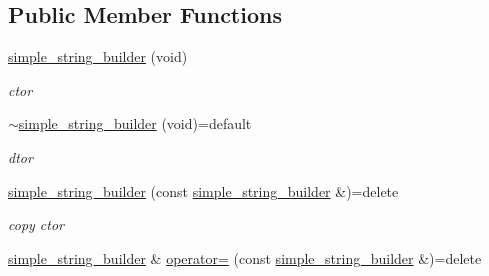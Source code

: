 \subsection*{Public Member Functions}
\begin{DoxyCompactItemize}
\item 
\mbox{\label{classcpp__redis_1_1builders_1_1simple__string__builder_a51fcb7777a78cbd3599aae8896e4d06a}} 
\hyperlink{classcpp__redis_1_1builders_1_1simple__string__builder_a51fcb7777a78cbd3599aae8896e4d06a}{simple\+\_\+string\+\_\+builder} (void)
\begin{DoxyCompactList}\small\item\em ctor \end{DoxyCompactList}\item 
\mbox{\label{classcpp__redis_1_1builders_1_1simple__string__builder_a7b4f012c532535801f9d5fddbb01d675}} 
\hyperlink{classcpp__redis_1_1builders_1_1simple__string__builder_a7b4f012c532535801f9d5fddbb01d675}{$\sim$simple\+\_\+string\+\_\+builder} (void)=default
\begin{DoxyCompactList}\small\item\em dtor \end{DoxyCompactList}\item 
\mbox{\label{classcpp__redis_1_1builders_1_1simple__string__builder_a0a17d659e654ee1190c635d3b3093235}} 
\hyperlink{classcpp__redis_1_1builders_1_1simple__string__builder_a0a17d659e654ee1190c635d3b3093235}{simple\+\_\+string\+\_\+builder} (const \hyperlink{classcpp__redis_1_1builders_1_1simple__string__builder}{simple\+\_\+string\+\_\+builder} \&)=delete
\begin{DoxyCompactList}\small\item\em copy ctor \end{DoxyCompactList}\item 
\mbox{\label{classcpp__redis_1_1builders_1_1simple__string__builder_afc86dd3148ef0094d08b4282f7cb597d}} 
\hyperlink{classcpp__redis_1_1builders_1_1simple__string__builder}{simple\+\_\+string\+\_\+builder} \& \hyperlink{classcpp__redis_1_1builders_1_1simple__string__builder_afc86dd3148ef0094d08b4282f7cb597d}{operator=} (const \hyperlink{classcpp__redis_1_1builders_1_1simple__string__builder}{simple\+\_\+string\+\_\+builder} \&)=delete

\end{DoxyCompactItemize}
